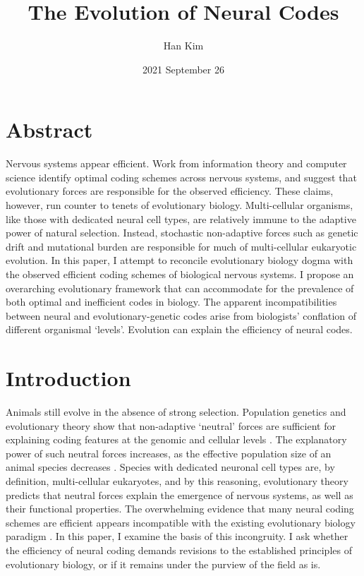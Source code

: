 \documentclass{article}
\begin{document}
\title{The Evolution of Neural Codes}
\author{Han Kim }
\date{2021 September 26}

\maketitle

\section*{Abstract}

Nervous systems appear efficient. Work from information theory and computer science identify optimal coding schemes across nervous systems, and suggest that evolutionary forces are responsible for the observed efficiency. These claims, however, run counter to tenets of evolutionary biology. Multi-cellular organisms, like those with dedicated neural cell types, are relatively immune to the adaptive power of natural selection. Instead, stochastic non-adaptive forces such as genetic drift and mutational burden are responsible for much of multi-cellular eukaryotic evolution. In this paper, I attempt to reconcile evolutionary biology dogma with the observed efficient coding schemes of biological nervous systems. I propose an overarching evolutionary framework that can accommodate for the prevalence of both optimal and inefficient codes in biology. The apparent incompatibilities between neural and evolutionary-genetic codes arise from biologists' conflation of different organismal `levels'. Evolution can explain the efficiency of neural codes. 

\section{Introduction}

Animals still evolve in the absence of strong selection. Population genetics and evolutionary theory show that non-adaptive `neutral' forces are sufficient for explaining coding features at the genomic and cellular levels \cite{Lynch_2007, lynch2007origins}. The explanatory power of such neutral forces increases, as the effective population size of an animal species decreases \cite{Lynch_Conery_2003, kimura1983neutral}. Species with dedicated neuronal cell types are, by definition, multi-cellular eukaryotes, and by this reasoning, evolutionary theory predicts that neutral forces explain the emergence of nervous systems, as well as their functional properties. The overwhelming evidence that many neural coding schemes are efficient appears incompatible with the existing evolutionary biology paradigm \cite{Barlow_2012, Pitkow_Meister_2012, Machens_Gollisch_Kolesnikova_Herz_2005, Mimica_Dunn_Tombaz_Bojja_Whitlock_2018}. In this paper, I examine the basis of this incongruity. I ask whether the efficiency of neural coding demands revisions to the established principles of evolutionary biology, or if it remains under the purview of the field as is.
\end{document}
